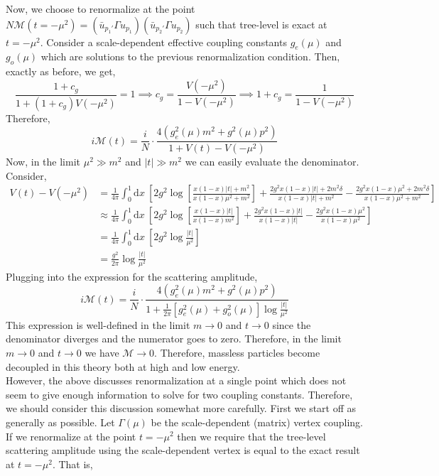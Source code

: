 \documentclass[12pt]{article}
\renewcommand{\d}[1]{ \mathrm{d}#1 \:}
\begin{document}
Now, we choose to renormalize at the point $N \mathcal{M}(t = -\mu^2) = ( \bar{u}_{p_1'} \Gamma u_{p_1}) (\bar{u}_{p_2'} \Gamma u_{p_2})$ such that tree-level is exact at $t = - \mu^2$. Consider a scale-dependent effective coupling constants $g_e(\mu)$ and $g_o(\mu)$ which are solutions to the previous renormalization condition. Then, exactly as before, we get,
\[ 
\frac{1 + c_g}{1 + (1 + c_g) V(-\mu^2)} = 1 \implies c_g  = \frac{V(-\mu^2)}{1 - V(-\mu^2)} \implies 1 + c_g = \frac{1}{1 - V(-\mu^2)} 
\]
Therefore, 
\[ 
i \mathcal{M}(t) = \frac{i}{N} \cdot \frac{4 \left( g_e^2(\mu) m^2 + g^2(\mu) p^2 \right)}{1 + V(t) - V(-\mu^2)} 
\]
Now, in the limit $\mu^2 \gg m^2$ and $|t| \gg m^2$ we can easily evaluate the denominator. Consider,
\begin{align*}
V(t) - V(-\mu^2) & = \frac{1}{4 \pi} \int_0^1 \d{x} \left[ 2 g^2 \log \left[ \frac{x(1 - x) |t| + m^2}{x(1-x) \mu^2 + m^2} \right] + \frac{2g^2 x(1-x) |t| + 2 m^2 \delta}{x(1-x) |t| + m^2} - \frac{2 g^2 x(1 - x) \mu^2 + 2 m^2 \delta}{x (1 - x) \mu^2 + m^2} \right]
\\
& \approx \frac{1}{4 \pi} \int_0^1 \d{x} \left[ 2 g^2 \log \left[ \frac{x(1 - x) |t|}{x(1 - x)m^2} \right] + \frac{2g^2 x(1-x) |t| }{x(1-x) |t|} - \frac{2g^2 x(1-x) \mu^2 }{x(1-x) \mu^2} \right]
\\
& = \frac{1}{4 \pi} \int_0^1 \d{x} \left[ 2g^2 \log{ \frac{|t|}{\mu^2} }  \right]
\\
& = \frac{g^2}{2 \pi} \log{\frac{|t|}{\mu^2}}
\end{align*}
Plugging into the expression for the scattering amplitude,
\[ i \mathcal{M}(t) = \frac{i}{N} \cdot \frac{4 \left( g_e^2(\mu) m^2 + g^2(\mu) p^2 \right)}{1 + \frac{1}{2\pi} {[g_e^2(\mu) + g_o^2(\mu)]} \log{ \frac{|t|}{\mu^2} }} \]
This expression is well-defined in the limit $m \to 0$ and $t \to 0$ since the denominator diverges and the numerator goes to zero. Therefore, in the limit $m \to 0$ and $t \to 0$ we have $\mathcal{M} \to 0$. Therefore, massless particles become decoupled in this theory both at high and low energy.  
\bigskip\\
However, the above discusses renormalization at a single point which does not seem to give enough information to solve for two coupling constants. Therefore, we should consider this discussion somewhat more carefully. First we start off as generally as possible. Let $\Gamma(\mu)$ be the scale-dependent (matrix) vertex coupling. If we renormalize at the point $t = -\mu^2$ then we require that the tree-level scattering amplitude using the scale-dependent vertex is equal to the exact result at $t = -\mu^2$. That is,
\end{document}
